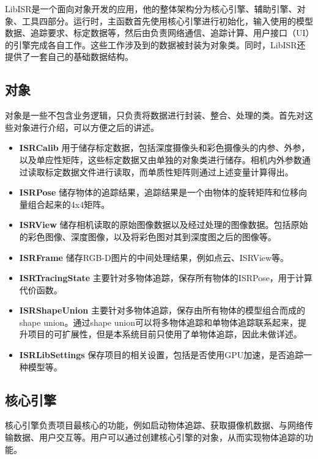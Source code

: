 LibISR是一个面向对象开发的应用，他的整体架构分为核心引擎、辅助引擎、对象、工具四部分。运行时，主函数首先使用核心引擎进行初始化，输入使用的模型数据、追踪要求、标定数据等，然后由负责网络通信、追踪计算、用户接口（UI）的引擎完成各自工作。这些工作涉及到的数据被封装为对象类。同时，LibISR还提供了一套自己的基础数据结构。

\subsection{对象}

对象是一些不包含业务逻辑，只负责将数据进行封装、整合、处理的类。首先对这些对象进行介绍，可以方便之后的讲述。

\begin{itemize}
    \item \textbf{ISRCalib}
用于储存标定数据，包括深度摄像头和彩色摄像头的内参、外参，以及单应性矩阵，这些标定数据又由单独的对象类进行储存。相机内外参数通过读取标定数据文件进行读取，而单质性矩阵则通过上述变量计算得出。
    
    \item \textbf{ISRPose}
储存物体的追踪结果，追踪结果是一个由物体的旋转矩阵和位移向量组合起来的4x4矩阵。
    
    \item \textbf{ISRView}
储存相机读取的原始图像数据以及经过处理的图像数据。包括原始的彩色图像、深度图像，以及将彩色图对其到深度图之后的图像等。

    \item \textbf{ISRFrame}
储存RGB-D图片的中间处理结果，例如点云、ISRView等。
    
    \item \textbf{ISRTracingState}
主要针对多物体追踪，保存所有物体的ISRPose，用于计算代价函数。

    \item \textbf{ISRShapeUnion}
主要针对多物体追踪，保存由所有物体的模型组合而成的shape union。通过shape union可以将多物体追踪和单物体追踪联系起来，提升项目的可扩展性，但是本系统目前只使用了单物体追踪，因此未做详述。

    \item \textbf{ISRLibSettings}
保存项目的相关设置，包括是否使用GPU加速，是否追踪一种模型等。
\end{itemize}

\subsection{核心引擎}

核心引擎负责项目最核心的功能，例如启动物体追踪、获取摄像机数据、与网络传输数据、用户交互等。用户可以通过创建核心引擎的对象，从而实现物体追踪的功能。

